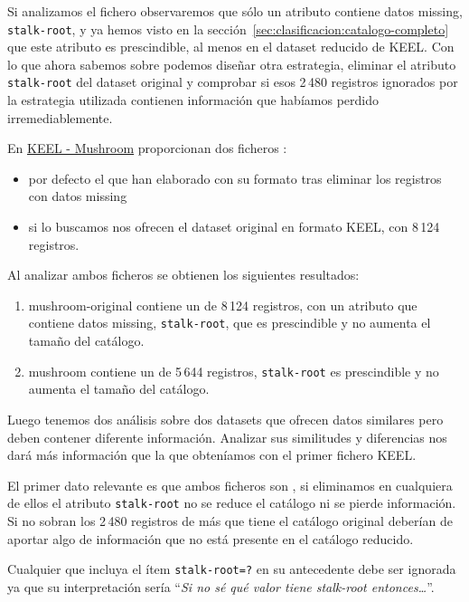 Si analizamos el fichero \mushroom observaremos que sólo un atributo contiene datos missing, \texttt{stalk-root}, y ya hemos visto en la sección~\ref{sec:clasificacion:catalogo-completo} que este atributo es prescindible, al menos en el dataset reducido de KEEL. Con lo que ahora sabemos sobre \catalogos podemos diseñar otra estrategia, eliminar el atributo \texttt{stalk-root} del dataset original y comprobar si esos 2\,480 registros ignorados por la estrategia utilizada contienen información que habíamos perdido irremediablemente.

En \href{http://sci2s.ugr.es/keel/dataset.php?cod=178}{KEEL - Mushroom} proporcionan dos ficheros \mushroom:
\begin{itemize}
  \item por defecto el que han elaborado con su formato tras eliminar los registros con datos missing
  \item si lo buscamos nos ofrecen el dataset original en formato KEEL, con 8\,124 registros.
\end{itemize}

Al analizar ambos ficheros se obtienen los siguientes resultados:
\begin{enumerate}
  \item mushroom-original contiene un \CC de 8\,124 registros, con un atributo que contiene datos missing, \texttt{stalk-root}, que es prescindible y no aumenta el tamaño del catálogo.
  \item mushroom contiene un \CC de 5\,644 registros, \texttt{stalk-root} es prescindible y no aumenta el tamaño del catálogo.
\end{enumerate}
Luego tenemos dos análisis sobre dos datasets que ofrecen datos similares pero deben contener diferente información. Analizar sus similitudes y diferencias nos dará más información que la que obteníamos con el primer fichero KEEL.

El primer dato relevante es que ambos ficheros son \CCs, si eliminamos en cualquiera de ellos el atributo \texttt{stalk-root} no se reduce el catálogo ni se pierde información. Si no sobran los 2\,480 registros de más que tiene el catálogo original deberían de aportar algo de información que no está presente en el catálogo reducido.

Cualquier \ar que incluya el ítem \texttt{stalk-root=?} en su antecedente debe ser ignorada ya que su interpretación sería ``\emph{Si no sé qué valor tiene stalk-root entonces\ldots}''.

